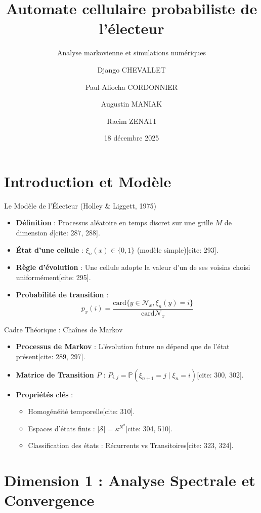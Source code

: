 \documentclass{beamer}
\title[Automate de l'électeur]{Automate cellulaire probabiliste de l'électeur}
\subtitle{Analyse markovienne et simulations numériques}
\author[Groupe 48]{Django CHEVALLET \and Paul-Aliocha CORDONNIER \and Augustin MANIAK \and Racim ZENATI}
\institute[]{ENSIMAG}
\date{18 décembre 2025}
\begin{document}
\begin{frame}
  \titlepage
\end{frame}

\section{Introduction et Modèle}

\begin{frame}{Le Modèle de l'Électeur (Holley \& Liggett, 1975)}
  \begin{itemize}
    \item \textbf{Définition} : Processus aléatoire en temps discret sur une grille $M$ de dimension $d$[cite: 287, 288].
    \item \textbf{État d'une cellule} : $\xi_n(x) \in \{0, 1\}$ (modèle simple)[cite: 293].
    \item \textbf{Règle d'évolution} : Une cellule adopte la valeur d'un de ses voisins choisi uniformément[cite: 295].
    \item \textbf{Probabilité de transition} :
    \[ p_{x}(i) = \frac{\text{card}\{y \in \mathcal{N}_x, \xi_n(y) = i\}}{\text{card} \mathcal{N}_x} \]
  \end{itemize}
  \end{frame}

\begin{frame}{Cadre Théorique : Chaînes de Markov}
  \begin{itemize}
    \item \textbf{Processus de Markov} : L'évolution future ne dépend que de l'état présent[cite: 289, 297].
    \item \textbf{Matrice de Transition $P$} : $P_{i,j} = \mathbb{P}(\xi_{n+1} = j \mid \xi_n = i)$[cite: 300, 302].
    \item \textbf{Propriétés clés} :
    \begin{itemize}
        \item Homogénéité temporelle[cite: 310].
        \item Espaces d'états finis : $|\mathcal{S}| = \kappa^{N^d}$[cite: 304, 510].
        \item Classification des états : Récurrents vs Transitoires[cite: 323, 324].
    \end{itemize}
  \end{itemize}
\end{frame}

\section{Dimension 1 : Analyse Spectrale et Convergence}
\end{document}
